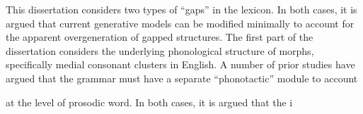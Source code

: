 This dissertation considers two types of ``gaps'' in the lexicon. In both cases, it is argued that current generative models can be modified minimally to account for the apparent overgeneration of gapped structures. The first part of the dissertation considers the underlying phonological structure of morphs, specifically medial consonant clusters in English. A number of prior studies have argued that the grammar must have a separate ``phonotactic'' module to account

at the level of prosodic word. In both cases, it is argued that the i
